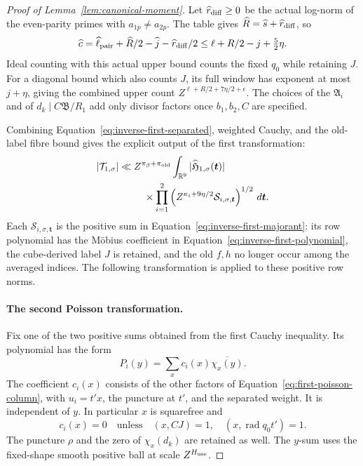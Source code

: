 \documentclass[11pt,a4paper]{article}
\numberwithin{equation}{section}
\numberwithin{figure}{section}
\theoremstyle{definition}
\theoremstyle{remark}
\begin{document}
\begin{proof}[Proof of Lemma~\ref{lem:canonical-moment}]
Let \(\widehat r_{\rm diff}\ge0\) be the actual log-norm of the
even-parity primes with \(a_{1p}\ne a_{2p}\).  The table gives
\(\widehat R=\widehat s+\widehat r_{\rm diff}\), so
\begin{equation}\label{eq:fixed-cube-count}
 \widehat c=\widehat\ell_{\rm pair}+\widehat R/2-\widehat j
                  -\widehat r_{\rm diff}/2
 \le\ell+R/2-j+\tfrac52\eta.
\end{equation}
Ideal counting with this actual upper bound counts the fixed \(q_0\)
while retaining \(J\).  For a diagonal bound which also counts \(J\),
its full window has exponent at most \(j+\eta\), giving the combined
upper count \(Z^{\ell+R/2+7\eta/2+\epsilon}\).  The choices of the
\(\mathfrak A_i\) and of \(d_k\mid C\mathfrak B/R_1\) add only
divisor factors once \(b_1,b_2,C\) are specified.

Combining Equation~\eqref{eq:inverse-first-separated}, weighted Cauchy,
and the old-label fibre bound gives the explicit output of the first
transformation:
\begin{equation}\label{eq:inverse-first-transform-output}
 \begin{split}
 |\mathcal T_{1,\sigma}|\ll{}&Z^{\pi_\beta+\pi_{\rm old}}
 \int_{\mathbb R^9}|\widehat{\mathfrak H}_{1,\sigma}(\boldsymbol t)|\\
 &\quad\times\prod_{i=1}^2
 \left(Z^{\kappa_i+9\eta/2}\mathcal S_{i,\sigma,\boldsymbol t}\right)^{1/2}
 \,d\boldsymbol t.
 \end{split}
\end{equation}
Each \(\mathcal S_{i,\sigma,\boldsymbol t}\) is the positive sum in
Equation~\eqref{eq:inverse-first-majorant}: its row polynomial has the
M\"obius coefficient in Equation~\eqref{eq:inverse-first-polynomial},
the cube-derived label \(J\) is retained, and the old \(f,h\) no longer
occur among the averaged indices. The following transformation is applied
to these positive row norms.

\paragraph{The second Poisson transformation.}
Fix one of the two positive sums obtained from the first Cauchy
inequality.  Its polynomial has the form
\[
 P_i(y)=\sum_x c_i(x)\overline{\chi_x(y)}.
\]
The coefficient \(c_i(x)\) consists of the other factors of
Equation~\eqref{eq:first-poisson-column}, with \(u_i=t'x\), the
puncture at \(t'\), and the separated weight.  It is independent of
\(y\).  In particular \(x\) is squarefree and
\[
 c_i(x)=0\quad\text{unless}\quad
 (x,CJ)=1,\quad (x,\operatorname{rad}q_0t')=1.
\]
The puncture \(\rho\) and the zero of \(\chi_x(d_k)\) are retained
as well.  The \(y\)-sum uses the fixed-shape smooth positive ball at
scale \(Z^{H_{\rm use}}\).


\end{proof}
\end{document}
